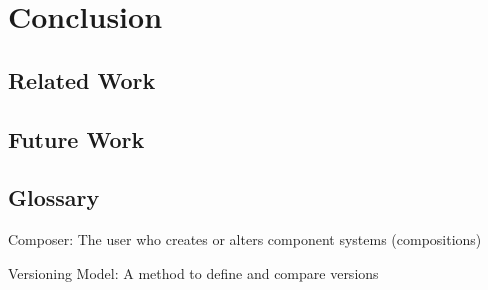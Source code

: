 \documentclass{report}
\begin{document}



\chapter{Conclusion}
\section{Related Work}
\section{Future Work}

\section{Glossary}
Composer: The user who creates or alters component systems (compositions)

Versioning Model: A method to define and compare versions
\end{document}
